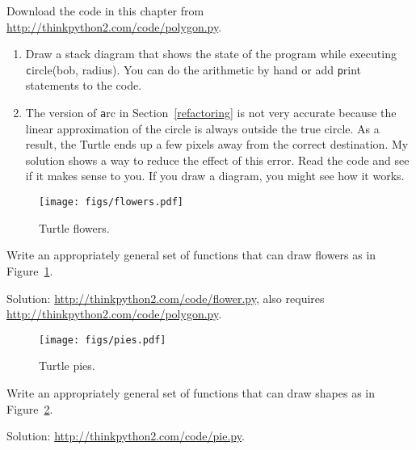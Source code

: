 \documentclass[
DIV=11,
fontsize=12,
twoside,
headinclude=false,
titlepage=firstiscover,
abstract=true,
headsepline=true,
footsepline=true,
chapterprefix=true, %
headings=big,
bibliography=totoc,%
captions=tableheading
]{scrbook}
\theoremstyle{definition}
\begin{document}
\begin{exercise}
\normalfont

Download the code in this chapter from
\url{http://thinkpython2.com/code/polygon.py}.

\begin{enumerate}

\item Draw a stack diagram that shows the state of the program
while executing {\texttt circle(bob, radius)}.  You can do the
arithmetic by hand or add {\texttt print} statements to the code.

\item The version of {\texttt arc} in Section~\ref{refactoring} is not
very accurate because the linear approximation of the
circle is always outside the true circle.  As a result,
the Turtle ends up a few pixels away from the correct
destination.  My solution shows a way to reduce
the effect of this error.  Read the code and see if it makes
sense to you.  If you draw a diagram, you might see how it works.

\end{enumerate}

\end{exercise}

\begin{figure}
\centerline
{\texttt{[image: figs/flowers.pdf]}}
\caption{Turtle flowers.}
\label{fig.flowers}
\end{figure}

\begin{exercise}
\normalfont
{}

Write an appropriately general set of functions that
can draw flowers as in Figure~\ref{fig.flowers}.

Solution: \url{http://thinkpython2.com/code/flower.py},
also requires \url{http://thinkpython2.com/code/polygon.py}.

\end{exercise}

\begin{figure}
\centerline
{\texttt{[image: figs/pies.pdf]}}
\caption{Turtle pies.}
\label{fig.pies}
\end{figure}


\begin{exercise}
\normalfont
{}

Write an appropriately general set of functions that
can draw shapes as in Figure~\ref{fig.pies}.

Solution: \url{http://thinkpython2.com/code/pie.py}.

\end{exercise}
\end{document}
